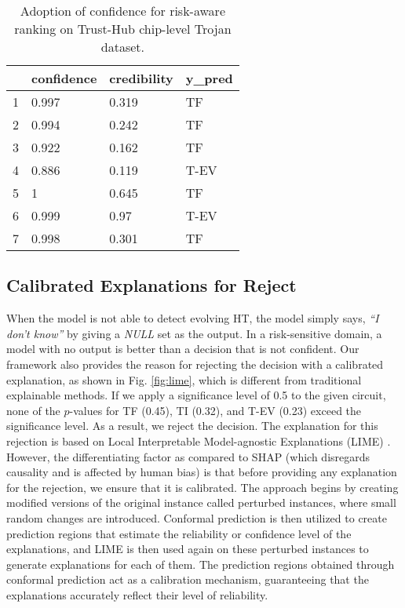 \documentclass[9pt,conference]{IEEEtran}
\begin{document}
\begin{table}[t]
\centering
\caption{Adoption of confidence for risk-aware ranking on Trust-Hub chip-level Trojan dataset.}
\begin{tabular}{llll}
\hline
  & \textbf{confidence} & \textbf{credibility} & \textbf{y\_pred} \\ \hline
1 & 0.997               & 0.319                & TF               \\ \hline
2 & 0.994               & 0.242                & TF               \\ \hline
3 & 0.922               & 0.162                & TF               \\ \hline
4 & 0.886               & 0.119                & T-EV             \\ \hline
5 & 1                   & 0.645                & TF               \\ \hline
6 & 0.999               & 0.97                 & T-EV             \\ \hline
7 & 0.998               & 0.301                & TF               \\ \hline
\end{tabular}
\label{tab:confcred}
\end{table}



\subsection{Calibrated Explanations for Reject}
\label{Sec:explain}
When the model is not able to detect evolving HT, the model simply says, \textit{``I don't know''} by giving a \textit{NULL} set as the output. In a risk-sensitive domain, a model with no output is better than a decision that is not confident. Our framework also provides the reason for rejecting the decision with a calibrated explanation, as shown in Fig. \ref{fig:lime}, which is different from traditional explainable methods. If we apply a significance level of 0.5 to the given circuit, none of the $p$-values for TF (0.45), TI (0.32), and T-EV (0.23) exceed the significance level. As a result, we reject the decision. The explanation for this rejection is based on Local Interpretable Model-agnostic Explanations (LIME) \cite{dieber2020model}. However, the differentiating factor as compared to SHAP (which disregards causality and is affected by human bias) is that before providing any explanation for the rejection, we ensure that it is calibrated. The approach begins by creating modified versions of the original instance called perturbed instances, where small random changes are introduced. Conformal prediction is then utilized to create prediction regions that estimate the reliability or confidence level of the explanations, and LIME is then used again on these perturbed instances to generate explanations for each of them. The prediction regions obtained through conformal prediction act as a calibration mechanism, guaranteeing that the explanations accurately reflect their level of reliability. 
\end{document}
